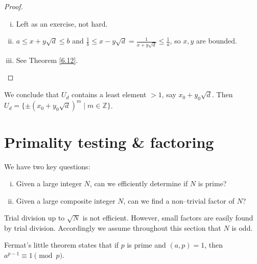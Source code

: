 \documentclass{article}
\theoremstyle{definition}
\begin{document}
\begin{proof}
    \begin{enumerate}[(i)]
        \item Left as an exercise, not hard.
        \item $a\le x + y \sqrt{d} \le b $ and $\frac{1}{b} \le x-y\sqrt{d} = \frac{1}{x+y\sqrt{d}} \le \frac{1}{a}$, so $x,y$ are bounded.
        \item See Theorem \ref{6.12}.
    \end{enumerate}
\end{proof}
We conclude that $U_d$ contains a least element $>1$, say $x_0+y_0\sqrt{d}$. Then $U_d = \{\pm (x_0+y_0\sqrt{d})^m \mid m \in \mathbb{Z}\}$.

\section{Primality testing \& factoring}


    We have two key questions:
    \begin{enumerate}[(i)]
        \item Given a large integer $N$, can we efficiently determine if $N$ is prime?
        \item Given a large composite integer $N$, can we find a non--trivial factor of $N$?
    \end{enumerate}

Trial division up to $\sqrt{N}$ is not efficient. However, small factors are easily found by trial division. Accordingly we assume throughout this section that $N$ is odd.
\vspace{1mm}

Fermat's little theorem states that if $p$ is prime and $(a,p)=1$, then $a^{p-1} \equiv 1 \pmod{p}$. 
\vspace{1mm}
\end{document}

